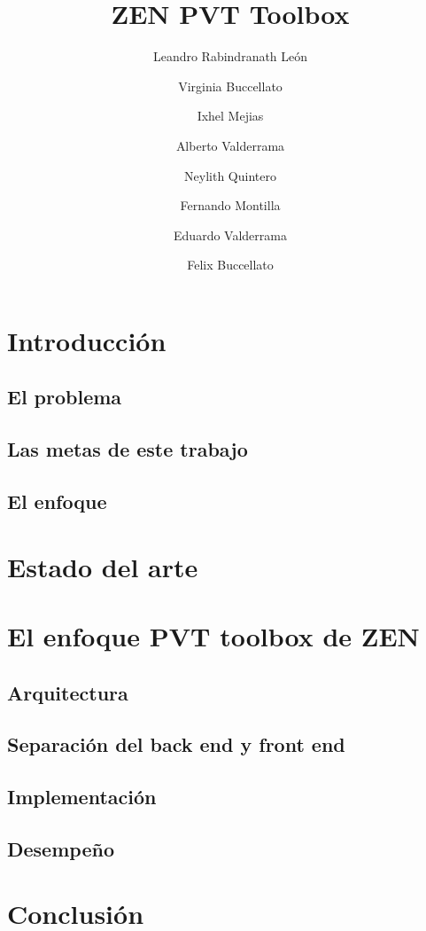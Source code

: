 \documentclass[9pt,conference]{IEEEtran}
\title{ZEN PVT Toolbox}
\author{Leandro Rabindranath León}
\author{Virginia  Buccellato}
\author{Ixhel Mejias}
\author{Alberto Valderrama}
\author{Neylith Quintero}
\author{Fernando Montilla}
\author{Eduardo Valderrama}
\author{Felix Buccellato}
\begin{document}
\maketitle

 \section{Introducción}

  \subsection{El problema}

  \subsection{Las metas de este trabajo}

  \subsection{El enfoque}

 \section{Estado del arte}

 \section{El enfoque PVT toolbox de ZEN}

  \subsection{Arquitectura}

  \subsection{Separación del back end y front end}

  \subsection{Implementación}

  \subsection{Desempeño}

 \section{Conclusión}
\end{document}
